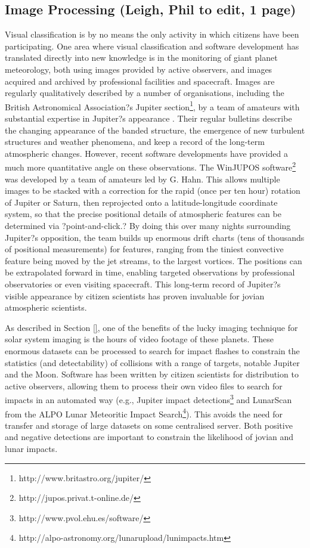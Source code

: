 \documentclass{ar2e}
\begin{document}

\subsection{Image Processing (\textbf{Leigh}, Phil to edit, 1 page)}
\label{sec:class:non-sensory}

Visual classification is by no means the only activity in which citizens have
been participating.  One area where visual classification and software
development has translated directly into new knowledge is in the monitoring of
giant planet meteorology, both using images provided by active observers, and
images acquired and archived by professional facilities and spacecraft. 
Images are regularly qualitatively described by a number of organisations,
including the British Astronomical Association?s Jupiter
section\footnote{http://www.britastro.org/jupiter/}, by a team of amateurs
with substantial expertise in Jupiter?s appearance \citep{95rogers}.  Their
regular bulletins describe the changing appearance of the banded structure,
the emergence of new turbulent structures and weather phenomena, and keep a
record of the long-term atmospheric changes.  However, recent software
developments have provided a much more quantitative angle on these
observations.  The WinJUPOS
software\footnote{http://jupos.privat.t-online.de/} was developed by a team of
amateurs led by G. Hahn.  This allows multiple images to be stacked with a
correction for the rapid (once per ten hour) rotation of Jupiter or Saturn,
then reprojected onto a latitude-longitude coordinate system, so that the
precise positional details of atmospheric features can be determined via
?point-and-click.?  By doing this over many nights surrounding Jupiter?s
opposition, the team builds up enormous drift charts (tens of thousands of
positional measurements) for features, ranging from the tiniest convective
feature being moved by the jet streams, to the largest vortices.  The
positions can be extrapolated forward in time, enabling targeted observations
by professional observatories or even visiting spacecraft.  This long-term
record of Jupiter?s visible appearance by citizen scientists has proven
invaluable for jovian atmospheric scientists.

As described in Section \ref{}, one of the benefits of the lucky imaging
technique for solar system imaging is the hours of video footage of these
planets.  These enormous datasets can be processed to search for impact
flashes to constrain the statistics (and detectability) of collisions with a
range of targets, notable Jupiter and the Moon.  Software has been written by
citizen scientists for distribution to active observers, allowing them to
process their own video files to search for impacts in an automated way (e.g.,
Jupiter impact detections\footnote{http://www.pvol.ehu.es/software/} and
LunarScan from the ALPO Lunar Meteoritic Impact
Search\footnote{http://alpo-astronomy.org/lunarupload/lunimpacts.htm}).  This
avoids the need for transfer and storage of large datasets on some centralised
server.  Both positive and negative detections are important to constrain the
likelihood of jovian and lunar impacts.
\end{document}
